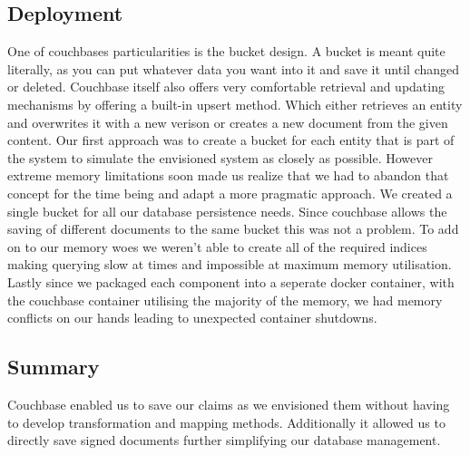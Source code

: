 \subsection{Deployment}
One of couchbases particularities is the bucket design. A bucket is meant quite literally, as you can put whatever data you want into it and save it until changed or deleted. Couchbase itself also offers very comfortable retrieval and updating mechanisms by
offering a built-in upsert method. Which either retrieves an entity and overwrites it with a new verison or creates a new document from the given content.
Our first approach was to create a bucket for each entity that is part of the system to simulate the envisioned system as closely as possible. However extreme memory limitations soon made us realize that we had to abandon that concept for the time being and adapt a more pragmatic approach.
We created a single bucket for all our database persistence needs. Since couchbase allows the saving of different documents to the same bucket this was not a problem.
To add on to our memory woes we weren't able to create all of the required indices making querying slow at times and impossible at maximum memory utilisation.
Lastly since we packaged each component into a seperate docker container, with the couchbase container utilising the majority of the memory, we had memory conflicts on our hands leading to unexpected container shutdowns.

\subsection{Summary}
\label{sec:databaseSummary}
Couchbase enabled us to save our claims as we envisioned them without having to develop transformation and mapping methods.
Additionally it allowed us to directly save signed documents further simplifying our database management.
